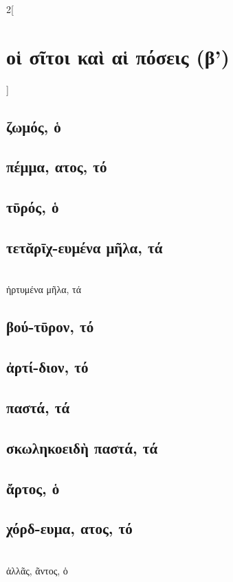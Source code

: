 \documentclass{book}
\begin{document}
\begin{multicols}{2}[\section{οἱ σῖτοι καὶ αἱ πόσεις (β')}]
\subsection{ζωμός, ὁ}
\subsection{πέμμα, ατος, τό}
\subsection{τῡρός, ὁ}
\subsection{τετᾰρῑχ-ευμένα μῆλα, τά}
 ~\\
ἠρτυμένα μῆλα, τά 
\subsection{βού-τῡρον, τό}
\subsection{ἀρτί-διον, τό}
\subsection{παστά, τά}
\subsection{σκωληκοειδὴ παστά, τά}
\subsection{ἄρτος, ὁ}
\subsection{χόρδ-ευμα, ατος, τό}
 ~\\
ἀλλᾶς, ᾶντος, ὁ

\end{multicols}
\end{document}
